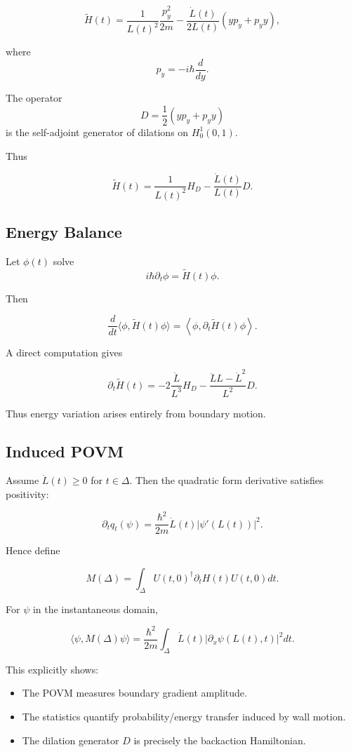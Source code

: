 \documentclass[11pt,a4paper]{article}
\begin{document}
\[
\widetilde H(t)
=
\frac{1}{L(t)^2}
\frac{p_y^2}{2m}
-
\frac{\dot L(t)}{2L(t)}
( y p_y + p_y y ),
\]

where
\[
p_y = -i\hbar \frac{d}{dy}.
\]

The operator
\[
D = \frac{1}{2}(y p_y + p_y y)
\]
is the self-adjoint generator of dilations on $H_0^1(0,1)$.

Thus

\[
\widetilde H(t)
=
\frac{1}{L(t)^2} H_D
-
\frac{\dot L(t)}{L(t)} D.
\]

\subsection{Energy Balance}

Let $\phi(t)$ solve
\[
i\hbar \partial_t \phi = \widetilde H(t)\phi.
\]

Then

\[
\frac{d}{dt}
\langle \phi, \widetilde H(t)\phi \rangle
=
\left\langle
\phi,
\partial_t \widetilde H(t)
\phi
\right\rangle.
\]

A direct computation gives

\[
\partial_t \widetilde H(t)
=
-2 \frac{\dot L}{L^3} H_D
-
\frac{\ddot L L - \dot L^2}{L^2} D.
\]

Thus energy variation arises entirely from boundary motion.

\subsection{Induced POVM}

Assume $\dot L(t)\ge 0$ for $t\in\Delta$.
Then the quadratic form derivative satisfies positivity:

\[
\partial_t q_t(\psi)
=
\frac{\hbar^2}{2m}
\dot L(t)
|\psi'(L(t))|^2.
\]

Hence define

\[
M(\Delta)
=
\int_\Delta
U(t,0)^\dagger
\partial_t H(t)
U(t,0)
dt.
\]

For $\psi$ in the instantaneous domain,

\[
\langle \psi, M(\Delta)\psi \rangle
=
\frac{\hbar^2}{2m}
\int_\Delta
\dot L(t)
|\partial_x \psi(L(t),t)|^2
dt.
\]

This explicitly shows:

\begin{itemize}
\item The POVM measures boundary gradient amplitude.
\item The statistics quantify probability/energy transfer
      induced by wall motion.
\item The dilation generator $D$ is precisely the
      backaction Hamiltonian.
\end{itemize}
\end{document}
